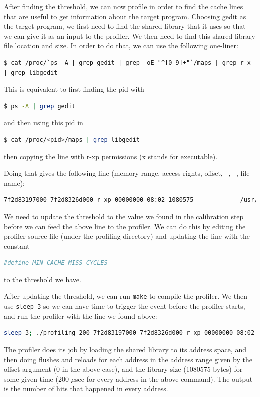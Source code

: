 After finding the threshold, we can now profile in order to find the cache lines that are useful to get information about the target program. Choosing gedit as the target program, we first need to find the shared library that it uses so that we can give it as an input to the profiler. We then need to find this shared library file location and size. In order to do that, we can use the following one-liner:
\begin{lstlisting}
$ cat /proc/`ps -A | grep gedit | grep -oE "^[0-9]+"`/maps | grep r-x | grep libgedit
\end{lstlisting}
This is equivalent to first finding the pid with
\begin{lstlisting}[language=bash]
  $ ps -A | grep gedit
\end{lstlisting}
and then using this pid in
\begin{lstlisting}[language=bash]
  $ cat /proc/<pid>/maps | grep libgedit
\end{lstlisting}
then copying the line with r-xp permissions (x stands for executable).

Doing that gives the following line (memory range, access rights, offset, –, –,
file name):

\begin{lstlisting}[language=bash]
7f2d83197000-7f2d8326d000 r-xp 00000000 08:02 1080575             /usr/lib/gedit/libgedit.so
\end{lstlisting}

We need to update the threshold to the value we found in the calibration step before we can feed the above line to the profiler. We can do this by
editing the profiler source file (under the profiling directory) and updating
the line with the constant 
\begin{lstlisting}[language=bash]
#define MIN_CACHE_MISS_CYCLES
\end{lstlisting}
to the threshold we have.

After updating the threshold, we can run \texttt{make} to compile the profiler.
We then use \texttt{sleep 3} so we can have time to trigger the event before the profiler starts, and run the profiler with the line we found above: 
\begin{lstlisting}[language=bash]
sleep 3; ./profiling 200 7f2d83197000-7f2d8326d000 r-xp 00000000 08:02 1080575                    /usr/lib/gedit/libgedit.so
\end{lstlisting}

The profiler does its job by loading the shared library to its address space,
and then doing flushes and reloads for each address in the address range given
by the offset argument (0 in the above case), and the library size (1080575
bytes) for some given time (200 $\mu$sec for every address in the above
command). The output is the number of hits that happened in every address.

